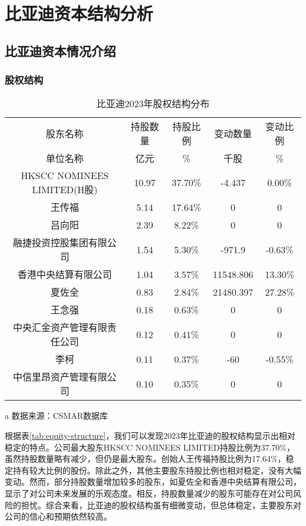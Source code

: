 \chapter{比亚迪资本结构分析}


\section{比亚迪资本情况介绍}


\subsection{股权结构}
\begin{table}
  \centering
  \begin{threeparttable}[c]
    \caption{比亚迪2023年股权结构分布}
    \label{tab:equity-structure}
    \begin{tabular}{ccccc}
      \toprule
        股东名称 & 持股数量 & 持股比例 & 变动数量 & 变动比例 \\ 
        单位名称 & 亿元    &  \%      &  千股   &  \%      \\
      \midrule
        HKSCC NOMINEES LIMITED(H股) & 10.97  & 37.70\% & -4.437 & 0.00\% \\ 
        王传福 & 5.14  & 17.64\% & 0 & 0 \\ 
        吕向阳 & 2.39  & 8.22\% & 0 & 0 \\ 
        融捷投资控股集团有限公司 & 1.54  & 5.30\% & -971.9 & -0.63\% \\ 
        香港中央结算有限公司 & 1.04  & 3.57\% & 11548.806 & 13.30\% \\ 
        夏佐全 & 0.83  & 2.84\% & 21480.397 & 27.28\% \\ 
        王念强 & 0.18  & 0.63\% & 0 & 0 \\ 
        中央汇金资产管理有限责任公司 & 0.12  & 0.41\% & 0 & 0 \\ 
        李柯 & 0.11  & 0.37\% & -60 & -0.55\% \\ 
        中信里昂资产管理有限公司 & 0.10  & 0.35\% & 0 & 0 \\ 
      \bottomrule
    \end{tabular}
    \begin{tablenotes}
      \item [a] 数据来源：CSMAR数据库
    \end{tablenotes}
  \end{threeparttable}
\end{table}
根据表\eqref{tab:equity-structure}，我们可以发现2023年比亚迪的股权结构显示出相对稳定的特点。公司最大股东HKSCC NOMINEES LIMITED持股比例为37.70\%，虽然持股数量略有减少，但仍是最大股东。创始人王传福持股比例为17.64\%，稳定持有较大比例的股份。除此之外，其他主要股东持股比例也相对稳定，没有大幅变动。然而，部分持股数量增加较多的股东，如夏佐全和香港中央结算有限公司，显示了对公司未来发展的乐观态度。相反，持股数量减少的股东可能存在对公司风险的担忧。综合来看，比亚迪的股权结构虽有细微变动，但总体稳定，主要股东对公司的信心和预期依然较高。
